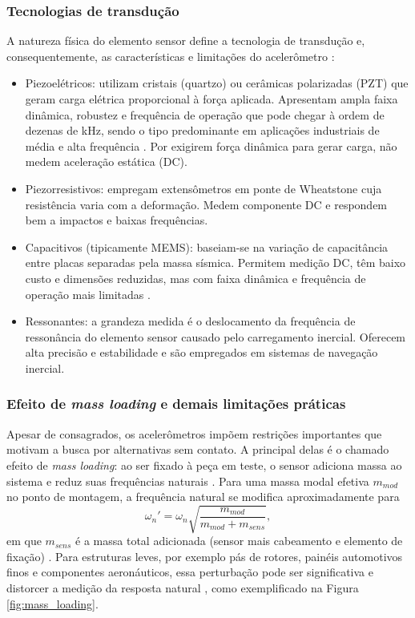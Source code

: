 \documentclass[a4paper,10pt,twocolumn]{article}
\begin{document}
\subsubsection{Tecnologias de transdução}

A natureza física do elemento sensor define a tecnologia de transdução e, consequentemente, as características e limitações do acelerômetro \cite{PiezoAccelerometer2023}:

\begin{itemize}
    \item Piezoelétricos: utilizam cristais (quartzo) ou cerâmicas polarizadas (PZT) que geram carga elétrica proporcional à força aplicada. Apresentam ampla faixa dinâmica, robustez e frequência de operação que pode chegar à ordem de dezenas de kHz, sendo o tipo predominante em aplicações industriais de média e alta frequência \cite{PiezoAccelerometer2023, aceletrometroDewesoft2025}. Por exigirem força dinâmica para gerar carga, não medem aceleração estática (DC).
    \item Piezorresistivos: empregam extensômetros em ponte de Wheatstone cuja resistência varia com a deformação. Medem componente DC e respondem bem a impactos e baixas frequências.
    \item Capacitivos (tipicamente MEMS): baseiam-se na variação de capacitância entre placas separadas pela massa sísmica. Permitem medição DC, têm baixo custo e dimensões reduzidas, mas com faixa dinâmica e frequência de operação mais limitadas \cite{Anna2026}.
    \item Ressonantes: a grandeza medida é o deslocamento da frequência de ressonância do elemento sensor causado pelo carregamento inercial. Oferecem alta precisão e estabilidade e são empregados em sistemas de navegação inercial.
\end{itemize}

\subsubsection{Efeito de \textit{mass loading} e demais limitações práticas}

Apesar de consagrados, os acelerômetros impõem restrições importantes que motivam a busca por alternativas sem contato. A principal delas é o chamado efeito de \textit{mass loading}: ao ser fixado à peça em teste, o sensor adiciona massa ao sistema e reduz suas frequências naturais \cite{AgilentAN243-3, Ewins2000}. Para uma massa modal efetiva $m_{mod}$ no ponto de montagem, a frequência natural se modifica aproximadamente para
\begin{equation}
    \omega_n' = \omega_n \sqrt{\frac{m_{mod}}{m_{mod} + m_{sens}}},
    \label{eq:mass_loading}
\end{equation}
em que $m_{sens}$ é a massa total adicionada (sensor mais cabeamento e elemento de fixação) \cite{Serridge1987}. Para estruturas leves, por exemplo pás de rotores, painéis automotivos finos e componentes aeronáuticos, essa perturbação pode ser significativa e distorcer a medição da resposta natural \cite{AgilentAN243-3, robotcamera2025}, como exemplificado na Figura \ref{fig:mass_loading}.
\end{document}
